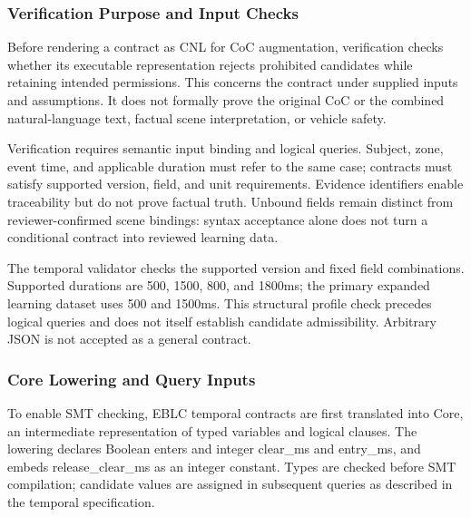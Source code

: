 \documentclass[nolineno]{ieeeaccess}
\begin{document}
\subsubsection{Verification Purpose and Input Checks}

Before rendering a contract as CNL for CoC augmentation, verification checks whether its executable representation rejects prohibited candidates while retaining intended permissions. This concerns the contract under supplied inputs and assumptions. It does not formally prove the original CoC or the combined natural-language text, factual scene interpretation, or vehicle safety.\par

Verification requires semantic input binding and logical queries. Subject, zone, event time, and applicable duration must refer to the same case; contracts must satisfy supported version, field, and unit requirements. Evidence identifiers enable traceability but do not prove factual truth. Unbound fields remain distinct from reviewer-confirmed scene bindings: syntax acceptance alone does not turn a conditional contract into reviewed learning data.\par

The temporal validator checks the supported version and fixed field combinations. Supported durations are 500, 1500, 800, and 1800ms; the primary expanded learning dataset uses 500 and 1500ms. This structural profile check precedes logical queries and does not itself establish candidate admissibility. Arbitrary JSON is not accepted as a general contract.\par

\subsubsection{Core Lowering and Query Inputs}

To enable SMT checking, EBLC temporal contracts are first translated into Core, an intermediate representation of typed variables and logical clauses. The lowering declares Boolean {\ttfamily{}\selectfont\footnotesize enters} and integer {\ttfamily{}\selectfont\footnotesize clear\_\allowbreak ms} and {\ttfamily{}\selectfont\footnotesize entry\_\allowbreak ms}, and embeds {\ttfamily{}\selectfont\footnotesize release\_\allowbreak clear\_\allowbreak ms} as an integer constant. Types are checked before SMT compilation; candidate values are assigned in subsequent queries as described in the temporal specification.\par
\end{document}
